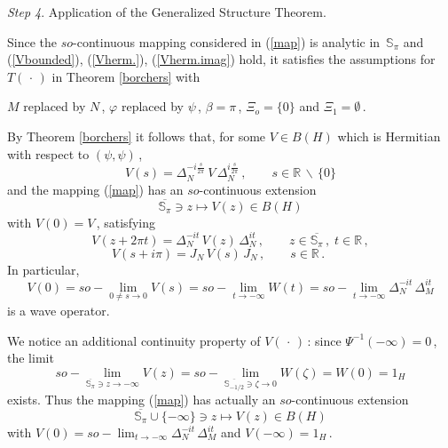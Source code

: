 \documentclass[reqno]{amsart}
\theoremstyle{definition}
\theoremstyle{remark}
\numberwithin{equation}{section}
\theoremstyle{plain}
\begin{document}
{\it Step 4}. {\sc Application of the Generalized Structure
Theorem.}
\medskip

Since the $so$-continuous mapping considered in (\ref{map}) is
analytic in $\,\mathbb S_\pi$ and (\ref{Vbounded}), (\ref{Vherm.}),
(\ref{Vherm.imag}) hold, it satisfies the
assumptions for $T(\,\cdot\, )$ in Theorem \ref{borchers} with
\begin{center}
$M$ replaced by $N\,$, $\varphi$ replaced by $\psi\,$,
$\beta =\pi\,$, $\Xi_o=\{ 0\}$ and $\Xi_1=\emptyset\,$.
\end{center}
By Theorem \ref{borchers} it follows that, for some $V\in B(H)$
which is Hermitian with respect to $(\psi ,\psi )\,$,
\begin{equation}\label{Vformula}
V(s)=\Delta_N^{\textstyle -i\frac s{2\pi}}\, V\,
\Delta_N^{\textstyle i\frac s{2\pi}}\, ,\qquad s\in\mathbb R\,
\backslash\,\{ 0\}
\end{equation}
and the mapping (\ref{map}) has an $so$-continuous extension
\begin{equation*}
\overline{\mathbb S_\pi}\ni z\longmapsto V(z)\in B(H)
\end{equation*}
with $V(0)=V\,$, satisfying
\begin{equation}\label{Vtransl}
V(z+2\pi t)=\Delta_N^{-it}\, V(z)\,\Delta_N^{it}\, ,
\qquad z\in\overline{\mathbb S_\pi}\, ,\; t\in\mathbb R\, ,
\end{equation}
\begin{equation}\label{transl+ipi}
V(s+i\pi )= J_N\, V(s)\, J_N\, ,\qquad s\in\mathbb R\, .
\;\phantom{xxx}
\end{equation}
In particular,
\begin{equation*}
V(0) = so-\lim_{0\neq s\to 0}V(s) =
so-\lim_{t\to -\infty} W(t)=
so-\lim_{t\to -\infty} \Delta_N^{-it}\,\Delta_M^{it}
\end{equation*}
is a wave operator.

We notice an additional continuity property of $V(\,\cdot\, )\,$:
since $\Psi^{-1}(-\infty )=0\,$, the limit
\begin{equation*}
so-\lim_{\overline{\mathbb S_\pi}\ni z\to -\infty} V(z) =
so-\lim_{\overline{\mathbb S_{-1/2}}\ni \zeta\to 0} W(\zeta ) =
W(0)=1_H
\end{equation*}
exists. Thus the mapping (\ref{map}) has actually an $so$-continuous
extension
\begin{equation}\label{fullmap}
\overline{\mathbb S_\pi}\cup\{ -\infty\}\ni z\longmapsto V(z)
\in B(H)
\end{equation}
with $\displaystyle V(0)=so-\lim_{t\to -\infty} \Delta_N^{-it}\,
\Delta_M^{it}$ and $V(-\infty )=1_H\,$.
\bigskip
\end{document}
